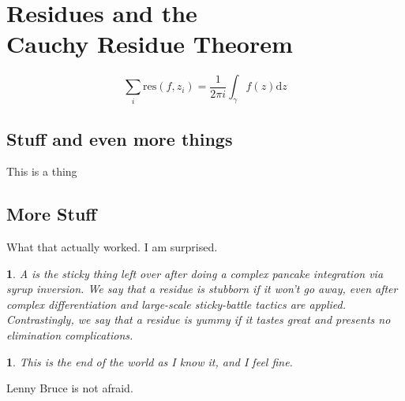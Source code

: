 \documentclass[10pt]{article}
\theoremstyle{marginlab}
\newtheorem{margindef}{\color{accol}{Definition}}
\numberwithin{margindef}{section}
\theoremstyle{marginlab}
\newtheorem{marginthm}{\color{accol}{Theorem}}
\numberwithin{marginthm}{section}
\begin{document}
\section{Residues and the\\Cauchy Residue Theorem}
\marginpar{

	}
\lipsum[2]

\begin{equation}
\sum_i  \mathrm{res}\left(f, z_i\right) = \frac{1}{2\pi i} \int_\gamma f(z) \mathrm{d}z
\end{equation}
\lipsum[1]

\subsection{Stuff and even more things} This is a thing
\subsection{More Stuff}

What that actually worked. I am surprised. \lipsum[1]
\begin{margindef}
A {\color{accol}{residue}} is the sticky thing left over after doing a complex pancake integration via syrup inversion.
We say that a residue is stubborn if it won't go away, even after complex differentiation and large-scale sticky-battle tactics are applied. Contrastingly, we say that a residue is yummy if it tastes great and presents no elimination complications.
\end{margindef}

\begin{marginthm}
	This is the end of the world as I know it, and I feel fine.
\end{marginthm}


Lenny Bruce is not afraid. \lipsum[8]
\end{document}
